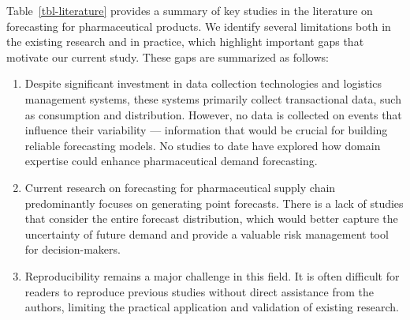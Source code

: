 \documentclass[
  authoryear,
  preprint,
  3p]{elsarticle}
\begin{document}
Table~\ref{tbl-literature} provides a summary of key studies in the
literature on forecasting for pharmaceutical products. We identify
several limitations both in the existing research and in practice, which
highlight important gaps that motivate our current study. These gaps are
summarized as follows:

\begin{enumerate}
\def\labelenumi{\arabic{enumi}.}
\item
  Despite significant investment in data collection technologies and
  logistics management systems, these systems primarily collect
  transactional data, such as consumption and distribution. However, no
  data is collected on events that influence their variability ---
  information that would be crucial for building reliable forecasting
  models. No studies to date have explored how domain expertise could
  enhance pharmaceutical demand forecasting.
\item
  Current research on forecasting for pharmaceutical supply chain
  predominantly focuses on generating point forecasts. There is a lack
  of studies that consider the entire forecast distribution, which would
  better capture the uncertainty of future demand and provide a valuable
  risk management tool for decision-makers.
\item
  Reproducibility remains a major challenge in this field. It is often
  difficult for readers to reproduce previous studies without direct
  assistance from the authors, limiting the practical application and
  validation of existing research.
\end{enumerate}
\end{document}
